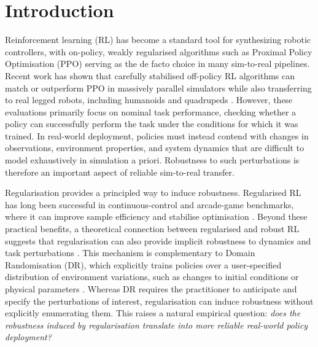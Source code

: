 \section{Introduction}\label{sec:intro}

Reinforcement learning (RL) has become a standard tool for synthesizing robotic controllers, with on-policy, weakly regularised algorithms such as Proximal Policy Optimisation (PPO) \citep{schulman2017proximal_PPO} serving as the de facto choice in many sim-to-real pipelines. Recent work has shown that carefully stabilised off-policy RL algorithms can match or outperform PPO in massively parallel simulators while also transferring to real legged robots, including humanoids and quadrupeds \citep{gallici2025simplifying_pqn, seo2025learning_fastsac, seo2025fasttd3, kim2026flashsac, rslrlsac2026bridging}. However, these evaluations primarily focus on nominal task performance, checking whether a policy can successfully perform the task under the conditions for which it was trained. In real-world deployment, policies must instead contend with changes in observations, environment properties, and system dynamics that are difficult to model exhaustively in simulation a priori. Robustness to such perturbations is therefore an important aspect of reliable sim-to-real transfer.

Regularisation provides a principled way to induce robustness. Regularised RL has long been successful in continuous-control and arcade-game benchmarks, where it can improve sample efficiency and stabilise optimisation \citep{dam2024unified_tree_search, haarnoja2018soft, ahmed_le_roux_2019_entropy_impact_pol_opt}. Beyond these practical benefits, a theoretical connection between regularised and robust RL suggests that regularisation can also provide implicit robustness to dynamics and task perturbations \citep{derman_twice_regularized, eysenbach2022maximum, pmlr-v130-husain21a_reg_pol_rew_rob, brekelmans2022_divergence_robustness}. This mechanism is complementary to Domain Randomisation (DR), which explicitly trains policies over a user-specified distribution of environment variations, such as changes to initial conditions or physical parameters \citep{eysenbach2022maximum, Mittal_Isaac_Lab_2025}. Whereas DR requires the practitioner to anticipate and specify the perturbations of interest, regularisation can induce robustness without explicitly enumerating them. This raises a natural empirical question: \textit{does the robustness induced by regularisation translate into more reliable real-world policy deployment?}

